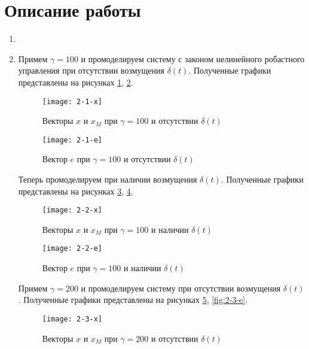 \documentclass[14pt, a4paper]{extarticle}
\begin{document}
	\newpage
	
	\section*{Описание работы}
	
	\begin{enumerate}
		\item 
		\item Примем $\gamma=100$ и промоделируем систему с законом нелинейного робастного управления при отсутствии возмущения $\delta(t)$. Полученные графики представлены на рисунках \ref{fig:2-1-x}, \ref{fig:2-1-e}.
		
		\begin{figure}[H]
			\centering
			\texttt{[image: 2-1-x]}
			\caption{Векторы $x$ и $x_M$ при $\gamma=100$ и отсутствии $\delta(t)$}
			\label{fig:2-1-x}
		\end{figure}
		
		\begin{figure}[H]
			\centering
			\texttt{[image: 2-1-e]}
			\caption{Вектор $e$ при $\gamma=100$ и отсутствии $\delta(t)$}
			\label{fig:2-1-e}
		\end{figure}
		
		Теперь промоделируем при наличии возмущения $\delta(t)$. Полученные графики представлены на рисунках \ref{fig:2-2-x}, \ref{fig:2-2-e}.
		
		\begin{figure}[H]
			\centering
			\texttt{[image: 2-2-x]}
			\caption{Векторы $x$ и $x_M$ при $\gamma=100$ и наличии $\delta(t)$}
			\label{fig:2-2-x}
		\end{figure}
		
		\begin{figure}[H]
			\centering
			\texttt{[image: 2-2-e]}
			\caption{Вектор $e$ при $\gamma=100$ и наличии $\delta(t)$}
			\label{fig:2-2-e}
		\end{figure}
		
		Примем $\gamma=200$ и промоделируем систему при отсутствии возмущения $\delta(t)$. Полученные графики представлены на рисунках \ref{fig:2-3-x}, \ref{fig:2-3-e}.
		
		\begin{figure}[H]
			\centering
			\texttt{[image: 2-3-x]}
			\caption{Векторы $x$ и $x_M$ при $\gamma=200$ и отсутствии $\delta(t)$}
			\label{fig:2-3-x}
		\end{figure}
		

\end{enumerate}
\end{document}

